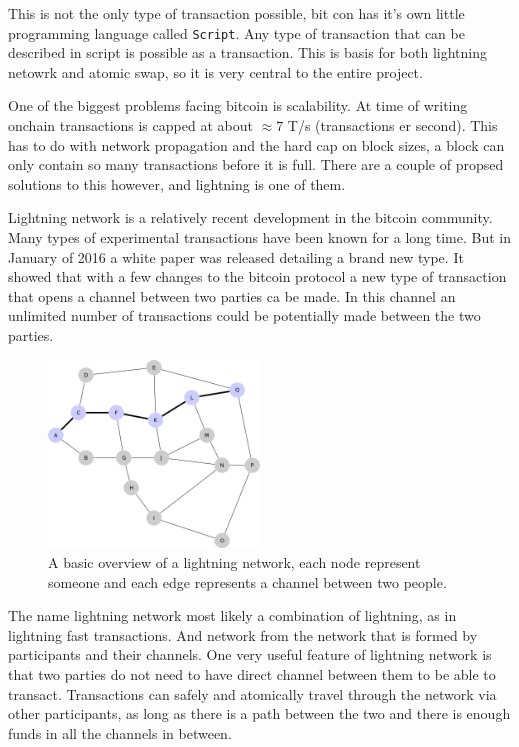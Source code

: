 This is not the only type of transaction possible, bit con has it's own little programming language called \texttt{Script}. Any type of transaction that can be described in script is possible as a transaction. This is basis for both lightning netowrk and atomic swap, so it is very central to the entire project. 

One of the biggest problems facing bitcoin is scalability. At time of writing onchain transactions is capped at about $\approx 7$ T/s (transactions er second).\cite{scaling} This has to do with network propagation and the hard cap on block sizes, a block can only contain so many transactions before it is full. There are a couple of propsed solutions to this however, and lightning is one of them. 

Lightning network is a relatively recent development in the bitcoin community. Many types of experimental transactions have been known for a long time. But in January of 2016 a white paper was released detailing a brand new type.\cite{lightningnetwork_2019} It showed that with a few changes to the bitcoin protocol a new type of transaction that opens a channel between two parties ca be made. In this channel an unlimited number of transactions could be potentially made between the two parties. \cite{lightningnetwork_2019}

\begin{figure}[H]
	\centering
	\includegraphics[width=0.50\textwidth]{introduction/images/mesh_network.png}
	\caption{A basic overview of a lightning network, each node represent someone and each edge represents a channel between two people.}
	\label{fig:blockchain2}
\end{figure}

The name lightning network most likely a combination of lightning, as in lightning fast transactions. And network from the network that is formed by participants and their channels. One very useful feature of lightning network is that two parties do not need to have direct channel between them to be able to transact. Transactions can safely and atomically travel through the network via other participants, as long as there is a path between the two and there is enough funds in all the channels in between.\cite{lightningnetwork_2019}

